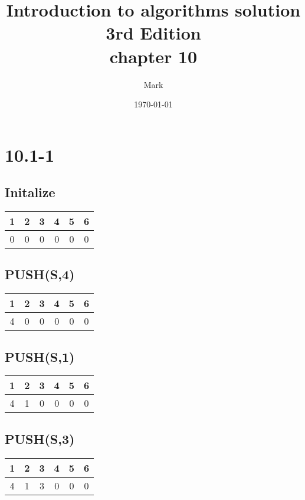 \documentclass{article}
\begin{document}
\title{Introduction to algorithms solution\\ 3rd Edition\\chapter 10}
\author{Mark}
\date {\today}

\maketitle
{}

\newpage
{}

\section*{10.1-1}
\subsection*{Initalize}
\begin{table}[H]
  \centering
  \begin{tabular}{|cccccc|}
    \hline
    1 & 2 & 3 & 4 & 5 & 6 \\
    \hline
    0 & 0 & 0 & 0 & 0 & 0 \\
    \hline
  \end{tabular}
\end{table}
\subsection*{PUSH(S,4)}
\begin{table}[H]
  \centering
  \begin{tabular}{|cccccc|}
    \hline
    1 & 2 & 3 & 4 & 5 & 6 \\
    \hline
    4 & 0 & 0 & 0 & 0 & 0 \\
    \hline
  \end{tabular}
\end{table}
\subsection*{PUSH(S,1)}
\begin{table}[H]
  \centering
  \begin{tabular}{|cccccc|}
    \hline
    1 & 2 & 3 & 4 & 5 & 6 \\
    \hline
    4 & 1 & 0 & 0 & 0 & 0 \\
    \hline
  \end{tabular}
\end{table}
\subsection*{PUSH(S,3)}
\begin{table}[H]
  \centering
  \begin{tabular}{|cccccc|}
    \hline
    1 & 2 & 3 & 4 & 5 & 6 \\
    \hline
    4 & 1 & 3 & 0 & 0 & 0 \\
    \hline
  \end{tabular}
\end{table}
\end{document}
